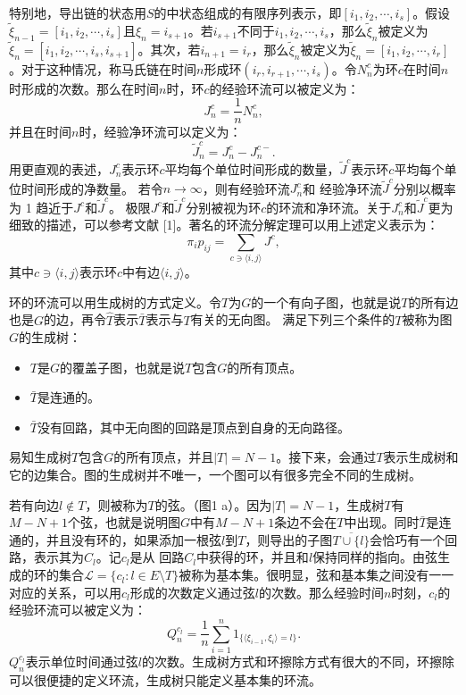 特别地，导出链的状态用$S$的中状态组成的有限序列表示，即$[i_1,i_2,\cdots,i_s]$。假设$\tilde{\xi}_{n-1}=[i_1,i_2,\cdots,i_s]$且$\xi_n = i_{s+1}$。若$i_{s+1}$不同于$i_1,i_2,\cdots,i_s$，那么$\tilde{\xi}_n$被定义为$\tilde{\xi}_n = [i_1,i_2,\cdots,i_s,i_{s+1}]$。其次，若$i_{n+1}=i_r$，那么$\tilde{\xi}_n$被定义为$\tilde{\xi}_n = [i_1,i_2,\cdots,i_r]$。对于这种情况，称马氏链在时间$n$形成环$(i_r,i_{r+1},\cdots,i_s)$。令$N^c_n$为环$c$在时间$n$时形成的次数。那么在时间$n$时，环$c$的经验环流可以被定义为：
\begin{equation*}
    J_n^c = \frac{1}{n}N^c_n,
\end{equation*}
并且在时间$n$时，经验净环流可以定义为：
\begin{equation*}
    \tilde{J}^c_n = J^c_n-J^{c-}_n.
\end{equation*}
用更直观的表述，$J^c_n$表示环$c$平均每个单位时间形成的数量，$\tilde{J}^c$表示环$c$平均每个单位时间形成的净数量。
若令$n\rightarrow\infty$，则有经验环流$J^c_n$和 经验净环流$\tilde{J}^c$分别以概率为 1 趋近于$J^c$和$\tilde{J}^c$。
极限$J^c$和$\tilde{J}^c$分别被视为环$c$的环流和净环流。关于$J^c_n$和$\tilde{J}^c$更为细致的描述，可以参考文献 [1]。著名的环流分解定理可以用上述定义表示为：
\begin{equation}\label{decomposition}
    \pi_ip_{ij} = \sum_{c\ni\langle i,j\rangle}J^c,
\end{equation}
其中$c \ni \langle i, j\rangle$表示环$c$中有边$\langle i, j\rangle$。

环的环流可以用生成树的方式定义。令$T$为$G$的一个有向子图，也就是说$T$的所有边也是$G$的边，再令$\hat{T}$表示$\bar{T}$表示与$T$有关的无向图。
满足下列三个条件的$T$被称为图$G$的生成树：
\begin{itemize}
    \item$T$是$G$的覆盖子图，也就是说$T$包含$G$的所有顶点。
    \item$\bar{T}$是连通的。
    \item$\bar{T}$没有回路，其中无向图的回路是顶点到自身的无向路径。
\end{itemize}

易知生成树$T$包含$G$的所有顶点，并且$|T| = N -1$。接下来，会通过$T$表示生成树和它的边集合。图的生成树并不唯一，一个图可以有很多完全不同的生成树。

若有向边$l \notin T$，则被称为$T$的弦。（图1 a）。因为$|T|= N-1$，生成树$T$有$M-N+1$个弦，也就是说明图$G$中有$M-N+1$条边不会在$T$中出现。同时$\bar{T}$是连通的，并且没有环的，如果添加一根弦$l$到$T$，则导出的子图$\overline{T \cup \{l\}}$会恰巧有一个回路，表示其为$C_l$。记$c_l$是从 回路$C_l$中获得的环，并且和$l$保持同样的指向。由弦生成的环的集合$\mathcal{L} = \{c_l: l\in E\setminus T\}$被称为基本集。很明显，弦和基本集之间没有一一对应的关系，可以用$c_l$形成的次数定义通过弦$l$的次数。那么经验时间$n$时刻，$c_l$的经验环流可以被定义为：
\begin{equation*}
    Q^{c_l}_n = \frac{1}{n}\sum_{i=1}^n1_{\{\langle\xi_{i-1},\xi_i\rangle=l\}}.
\end{equation*}
$Q^{c_l}_n$表示单位时间通过弦$l$的次数。生成树方式和环擦除方式有很大的不同，环擦除可以很便捷的定义环流，生成树只能定义基本集的环流。

